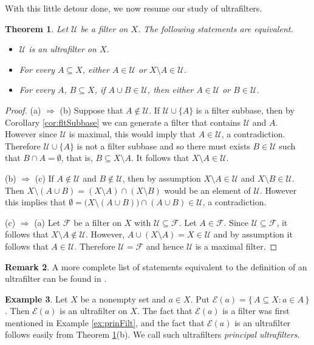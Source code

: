 \documentclass[12pt]{article}
\theoremstyle{plain}
\newtheorem{thm}{Theorem}[section]
\theoremstyle{definition}
\newtheorem{rmk}[thm]{Remark}
\newtheorem{example}[thm]{Example}
\newcommand{\calE}{\mathcal{E}}
\newcommand{\calF}{\mathcal{F}}
\newcommand{\calU}{\mathcal{U}}
\begin{document}
With this little detour done, we now resume our study of ultrafilters.

\begin{thm}
  \label{thm:equivUf}
  Let $\calU$ be a filter on $X$.
  The following statements are equivalent.
  \begin{itemize}
    \item[(a)] $\calU$ is an ultrafilter on $X$.
    \item[(b)] For every $A \subseteq X$, either $A \in \calU$ or $X \setminus A \in \calU$.
    \item[(c)] For every $A$, $B \subseteq X$, if $A \cup B \in \calU$, then either $A \in \calU$ or $B \in \calU$.
  \end{itemize}
\end{thm}
\begin{proof}
  (a) $\Rightarrow$ (b)
  Suppose that $A \not\in \calU$.
  If $\calU \cup \{A\}$ is a filter subbase, then by Corollary
  \ref{cor:fltSubbase} we can generate a filter that contains $\calU$
  and $A$.
  However since $\calU$ is maximal, this would imply that $A \in
  \calU$, a contradiction.
  Therefore $\calU \cup \{A\}$ is not a filter subbase and so there
  must exists $B \in \calU$ such that $B \cap A = \emptyset$, that is,
  $B \subseteq X \setminus A$.
  It follows that $X \setminus A \in \calU$.
  
  (b) $\Rightarrow$ (c)
  If $A \not\in \calU$ and $B \not\in \calU$, then by assumption $X
  \setminus A \in \calU$ and $X \setminus B \in \calU$.
  Then $X \setminus (A \cup B) = (X \setminus A) \cap (X \setminus B)$
  would be an element of $\calU$.
  However this implies that $\emptyset = \bigl(X \setminus (A \cup
  B)\bigr) \cap (A \cup B) \in \calU$, a contradiction.

  (c) $\Rightarrow$ (a)
  Let $\calF$ be a filter on $X$ with $\calU \subseteq \calF$.
  Let $A \in \calF$.
  Since $\calU \subseteq \calF$, it follows that $X \setminus A
  \not\in \calU$.
  However, $A \cup (X \setminus A) = X \in \calU$ and by assumption it
  follows that $A \in \calU$.
  Therefore $\calU = \calF$ and hence $\calU$ is a maximal filter.
\end{proof}
\begin{rmk}
  A more complete list of statements equivalent to the definition of an ultrafilter can be found in \cite[Theorem 3.6]{Hindman:1998fk}.
\end{rmk}

\begin{example}
  Let $X$ be a nonempty set and $a \in X$.
  Put $\calE(a) = \{\, A \subseteq X : a \in A \,\}$.
  Then $\calE(a)$ is an ultrafilter on $X$.
  The fact that $\calE(a)$ is a filter was first mentioned in Example  \ref{ex:prinFilt}, and the fact that $\calE(a)$ is an ultrafilter
  follows easily from Theorem \ref{thm:equivUf}(b).
  We call such ultrafilters \textsl{principal ultrafilters}.
\end{example}
\end{document}

